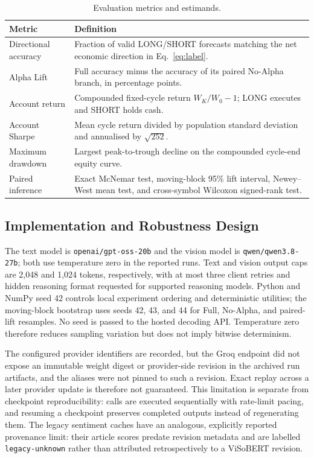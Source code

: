 \begin{table}[H]
\centering
\caption{Evaluation metrics and estimands.}
\label{tab:evaluation_metrics}
\renewcommand{\arraystretch}{1.16}
\begin{tabularx}{\textwidth}{|l|X|}
\hline
\textbf{Metric} & \textbf{Definition} \\
\hline
Directional accuracy & Fraction of valid LONG/SHORT forecasts matching the net economic direction in Eq.~\eqref{eq:label}. \\
\hline
Alpha Lift & Full accuracy minus the accuracy of its paired No-Alpha branch, in percentage points. \\
\hline
Account return & Compounded fixed-cycle return $W_K/W_0-1$; LONG executes and SHORT holds cash. \\
\hline
Account Sharpe & Mean cycle return divided by population standard deviation and annualised by $\sqrt{252}$. \\
\hline
Maximum drawdown & Largest peak-to-trough decline on the compounded cycle-end equity curve. \\
\hline
Paired inference & Exact McNemar test, moving-block 95\% lift interval, Newey--West mean test, and cross-symbol Wilcoxon signed-rank test. \\
\hline
\end{tabularx}
\end{table}

\subsection{Implementation and Robustness Design}

The text model is \texttt{openai/gpt-oss-20b} and the vision model is \texttt{qwen/qwen3.8-27b}; both use temperature zero in the reported runs. Text and vision output caps are 2,048 and 1,024 tokens, respectively, with at most three client retries and hidden reasoning format requested for supported reasoning models. Python and NumPy seed 42 controls local experiment ordering and deterministic utilities; the moving-block bootstrap uses seeds 42, 43, and 44 for Full, No-Alpha, and paired-lift resamples. No seed is passed to the hosted decoding API. Temperature zero therefore reduces sampling variation but does not imply bitwise determinism.

The configured provider identifiers are recorded, but the Groq endpoint did not expose an immutable weight digest or provider-side revision in the archived run artifacts, and the aliases were not pinned to such a revision. Exact replay across a later provider update is therefore not guaranteed. This limitation is separate from checkpoint reproducibility: calls are executed sequentially with rate-limit pacing, and resuming a checkpoint preserves completed outputs instead of regenerating them. The legacy sentiment caches have an analogous, explicitly reported provenance limit: their article scores predate revision metadata and are labelled \texttt{legacy-unknown} rather than attributed retrospectively to a ViSoBERT revision.

